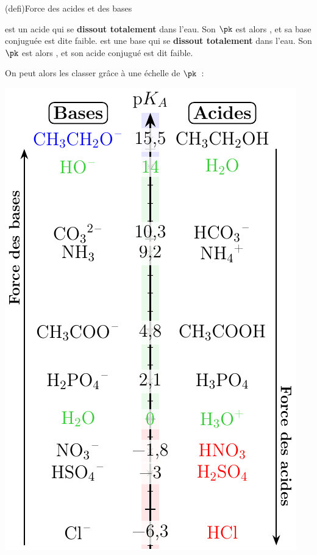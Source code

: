 \documentclass[../../main/main.tex]{subfiles}
\begin{document}
\begin{tcb*}[sidebyside, righthand ratio=.25](defi){Force des acides et des bases}
	\begin{itemize}
		 est un acide qui se \textbf{dissout totalement} dans
		l'eau. Son $\pk$ est alors , et sa base conjuguée est dite
		faible.
		\vspace{-15pt}
		 est une base qui se \textbf{dissout totalement} dans
		l'eau. Son $\pk$ est alors , et son acide conjugué est dit
		faible.
		\vspace{-15pt}
	\end{itemize}
	On peut alors les classer grâce à une échelle de $\pk$~:
	\tcblower
	\begin{center}
		\includegraphics[width=\linewidth]{pka_scale}

\end{center}
\end{tcb*}
\end{document}
